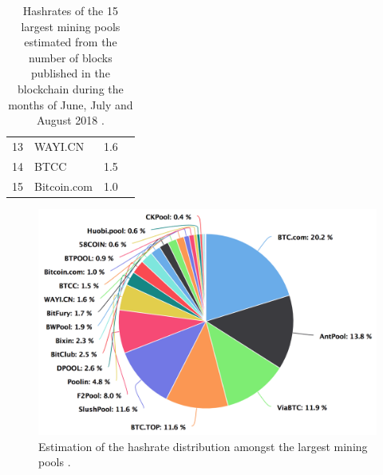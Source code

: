 \begin{table}[h!]
\begin{tabular}{rlrr}
		\num{13}               & WAYI.CN                  & \num{1.6}                          \\
		\num{14}               & BTCC                     & \num{1.5}                          \\
		\num{15}               & Bitcoin.com              & \num{1.0}                          \\
		\bottomrule
	\end{tabular}
	\caption[Estimation of the hashrate of the top largest mining pools]{Hashrates of the \num{15} largest mining pools estimated from the number of blocks published in the blockchain during the months of June, July and August \num{2018} \cite{stats_pools}.}
	\label{tab:pools}
\end{table}

\begin{figure}[h!]
	\centering
	\vspace*{0.50cm}
	\vspace*{0.25cm}
	\includegraphics[width=0.9\columnwidth]{figures/pools}
	\vspace*{0.25cm}
	\caption[Estimation of the hashrate distribution amongst the largest mining pools]{
		Estimation of the hashrate distribution amongst the largest mining pools
		\footnotemark.
	}
	\label{fig:pools}
\end{figure}
